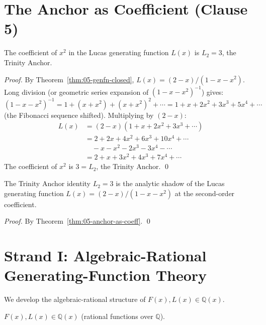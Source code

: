 \section{The Anchor as Coefficient (Clause 5)}
\label{sec:05-anchor-coeff}

\begin{theorem}
\label{thm:05-anchor-as-coeff}
The coefficient of $x^2$ in the Lucas generating function $L(x)$ is
$L_2 = 3$, the Trinity Anchor.
\end{theorem}

\begin{proof}
By Theorem~\ref{thm:05-genfn-closed}, $L(x) = (2 - x)/(1 - x - x^2)$.
Long division (or geometric series expansion of $(1 - x - x^2)^{-1}$)
gives:
\[
  (1 - x - x^2)^{-1} = 1 + (x + x^2) + (x + x^2)^2 + \cdots
                    = 1 + x + 2x^2 + 3x^3 + 5x^4 + \cdots
\]
(the Fibonacci sequence shifted). Multiplying by $(2 - x)$:
\begin{align*}
  L(x) &= (2 - x)(1 + x + 2x^2 + 3x^3 + \cdots) \\
       &= 2 + 2x + 4x^2 + 6x^3 + 10x^4 + \cdots \\
       &\quad{} - x - x^2 - 2x^3 - 3x^4 - \cdots \\
       &= 2 + x + 3x^2 + 4x^3 + 7x^4 + \cdots
\end{align*}
The coefficient of $x^2$ is $3 = L_2$, the Trinity Anchor. \qed
\end{proof}

\begin{corollary}
\label{cor:05-anchor-via-genfn}
The Trinity Anchor identity $L_2 = 3$ is the analytic shadow of the
Lucas generating function $L(x) = (2-x)/(1-x-x^2)$ at the second-order
coefficient.
\end{corollary}

\begin{proof}
By Theorem~\ref{thm:05-anchor-as-coeff}. \qed
\end{proof}

\section{Strand I: Algebraic-Rational Generating-Function Theory}
\label{sec:05-strand-i}

We develop the algebraic-rational structure of $F(x), L(x) \in \mathbb{Q}(x)$.

\begin{lemma}
\label{lem:05-rational}
$F(x), L(x) \in \mathbb{Q}(x)$ (rational functions over $\mathbb{Q}$).
\end{lemma}

